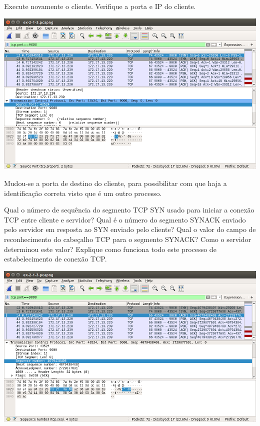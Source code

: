 \documentclass[a4paper, 11pt, answers]{exam}
\begin{document}
\begin{questions}
\begin{parts}
\begin{subparts}
        \subpart
        Execute novamente o cliente. Verifique a porta e IP do cliente.

        \begin{solution}
          \includegraphics[width=\linewidth]{ex-2-1-3.png}
          \vspace{1em}

          Mudou-se a porta de destino do cliente, para possibilitar
          com que haja a identificação correta visto que é um outro processo.
        \end{solution}

        \subpart
        Qual o número de sequência do segmento TCP SYN usado para iniciar a
        conexão TCP entre cliente e servidor? Qual é o número do segmento
        SYNACK enviado pelo servidor em resposta ao SYN enviado pelo cliente?
        Qual o valor do campo de reconhecimento do cabeçalho TCP para o 
        segmento SYNACK? Como o servidor determinou este valor? Explique
        como funciona todo este processo de estabelecimento de conexão TCP.

        \begin{solution}
          \includegraphics[width=\linewidth]{ex-2-1-4.png}
          \vspace{1em}


\end{solution}
\end{subparts}
\end{parts}
\end{questions}
\end{document}
